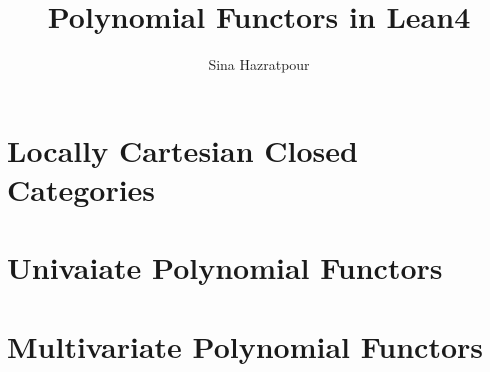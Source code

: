 
\title{Polynomial Functors in Lean4}
\author{Sina Hazratpour}


\maketitle

\chapter{Locally Cartesian Closed Categories}

\chapter{Univaiate Polynomial Functors}

\chapter{Multivariate Polynomial Functors}


{}



